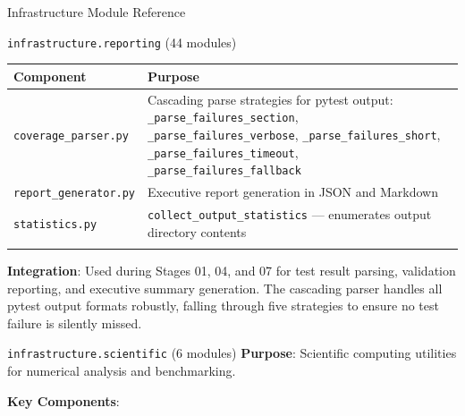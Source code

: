 \documentclass[
  ignorenonframetext,
]{beamer}
\newcounter{none} %
\begin{document}
\begin{frame}[fragile]{Infrastructure Module Reference}
\begin{block}{\texttt{infrastructure.reporting} (44 modules)}
{\def\LTcaptype{none} %
\begin{longtable}[]{@{}
  >{\raggedright\arraybackslash}p{}
  >{\raggedright\arraybackslash}p{}@{}}
\toprule\noalign{}
\begin{minipage}[b]{\linewidth}\raggedright
Component
\end{minipage} & \begin{minipage}[b]{\linewidth}\raggedright
Purpose
\end{minipage} \\
\midrule\noalign{}
\endhead
\texttt{coverage\_parser.py} & Cascading parse strategies for pytest
output: \texttt{\_parse\_failures\_section},
\texttt{\_parse\_failures\_verbose}, \texttt{\_parse\_failures\_short},
\texttt{\_parse\_failures\_timeout},
\texttt{\_parse\_failures\_fallback} \\
\texttt{report\_generator.py} & Executive report generation in JSON and
Markdown \\
\texttt{statistics.py} & \texttt{collect\_output\_statistics} ---
enumerates output directory contents \\
\bottomrule\noalign{}
\end{longtable}
}

\textbf{Integration}: Used during Stages 01, 04, and 07 for test result
parsing, validation reporting, and executive summary generation. The
cascading parser handles all pytest output formats robustly, falling
through five strategies to ensure no test failure is silently missed.
\end{block}

\begin{block}{\texttt{infrastructure.scientific} (6 modules)}
\protect{}\label{infrastructure.scientific-6-modules}
\textbf{Purpose}: Scientific computing utilities for numerical analysis
and benchmarking.

\textbf{Key Components}:


\end{block}
\end{frame}
\end{document}
